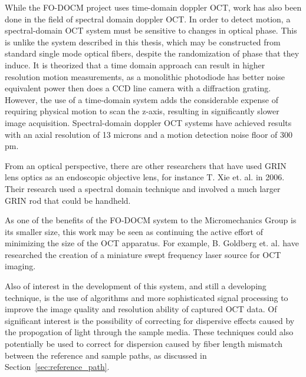 While the FO-DOCM project uses time-domain doppler OCT, work has also been done in the field of spectral domain doppler OCT. \cite{Choudhury2011} \cite{Subhash2012} In order to detect motion, a spectral-domain OCT system must be sensitive to changes in optical phase. This is unlike the system described in this thesis, which may be constructed from standard single mode optical fibers, despite the randomization of phase that they induce. It is theorized that a time domain approach can result in higher resolution motion measurements, as a monolithic photodiode has better noise equivalent power then does a CCD line camera with a diffraction grating. However, the use of a time-domain system adds the considerable expense of requiring physical motion to scan the z-axis, resulting in significantly slower image acquisition. Spectral-domain doppler OCT systems have achieved results with an axial resolution of 13 microns and a motion detection noise floor of 300 pm. \cite{Choudhury2011}  %

From an optical perspective, there are other researchers that have used GRIN lens optics as an endoscopic objective lens, for instance T. Xie et. al. in 2006. \cite{Xie2006} Their research used a spectral domain technique and involved a much larger GRIN rod that could be handheld.

As one of the benefits of the FO-DOCM system to the Micromechanics Group is its smaller size, this work may be seen as continuing the active effort of minimizing the size of the OCT apparatus. For example, B. Goldberg et. al. have researched the creation of a miniature swept frequency laser source for OCT imaging. \cite{Goldberg2009}

Also of interest in the development of this system, and still a developing technique, is the use of algorithms and more sophisticated signal processing to improve the image quality and resolution ability of captured OCT data. Of significant interest is the possibility of correcting for dispersive effects caused by the propogation of light through the sample media. \cite{Xie2005} \cite{DrexlerBook} These techniques could also potentially be used to correct for dispersion caused by fiber length mismatch between the reference and sample paths, as discussed in Section~\ref{sec:reference_path}.